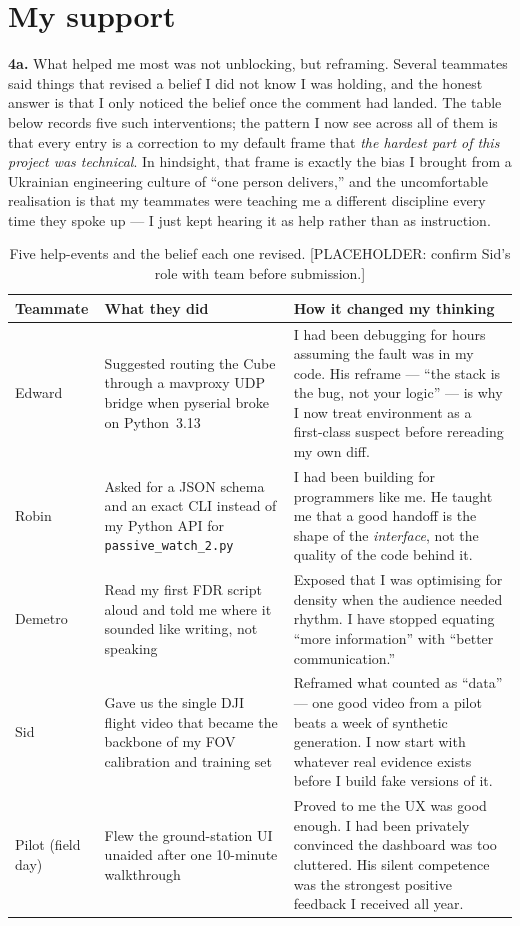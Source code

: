 
\section{My support}

\textbf{4a.} What helped me most was not unblocking, but reframing. Several teammates said things that revised a belief I did not know I was holding, and the honest answer is that I only noticed the belief once the comment had landed. The table below records five such interventions; the pattern I now see across all of them is that every entry is a correction to my default frame that \emph{the hardest part of this project was technical}. In hindsight, that frame is exactly the bias I brought from a Ukrainian engineering culture of ``one person delivers,'' and the uncomfortable realisation is that my teammates were teaching me a different discipline every time they spoke up --- I just kept hearing it as help rather than as instruction.

\begin{table}[h]
\small
\centering
\begin{tabular}{@{}p{2cm}p{4.5cm}p{7cm}@{}}
\toprule
\textbf{Teammate} & \textbf{What they did} & \textbf{How it changed my thinking} \\
\midrule
Edward & Suggested routing the Cube through a mavproxy UDP bridge when pyserial broke on Python~3.13 & I had been debugging for hours assuming the fault was in my code. His reframe --- ``the stack is the bug, not your logic'' --- is why I now treat environment as a first-class suspect before rereading my own diff. \\
Robin & Asked for a JSON schema and an exact CLI instead of my Python API for \texttt{passive\_watch\_2.py} & I had been building for programmers like me. He taught me that a good handoff is the shape of the \emph{interface}, not the quality of the code behind it. \\
Demetro & Read my first FDR script aloud and told me where it sounded like writing, not speaking & Exposed that I was optimising for density when the audience needed rhythm. I have stopped equating ``more information'' with ``better communication.'' \\
Sid & Gave us the single DJI flight video that became the backbone of my FOV calibration and training set & Reframed what counted as ``data'' --- one good video from a pilot beats a week of synthetic generation. I now start with whatever real evidence exists before I build fake versions of it. \\
Pilot (field day) & Flew the ground-station UI unaided after one 10-minute walkthrough & Proved to me the UX was good enough. I had been privately convinced the dashboard was too cluttered. His silent competence was the strongest positive feedback I received all year. \\
\bottomrule
\end{tabular}
\caption{Five help-events and the belief each one revised. [PLACEHOLDER: confirm Sid's role with team before submission.]}
\end{table}

